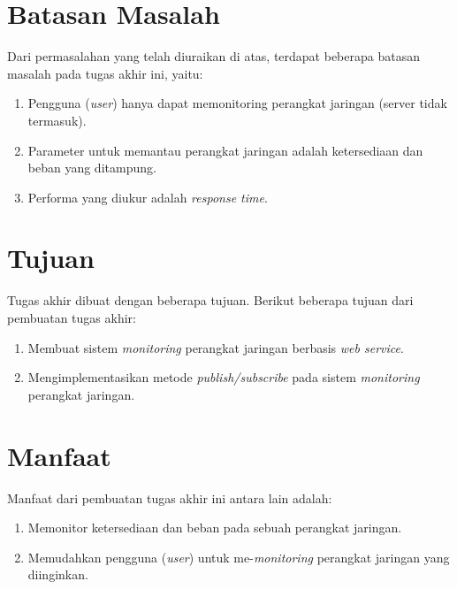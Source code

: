 	\section{Batasan Masalah}
		Dari permasalahan yang telah diuraikan di atas, terdapat beberapa batasan masalah pada tugas akhir ini, yaitu:
		\begin{enumerate}
			\item Pengguna (\textit{user}) hanya dapat memonitoring perangkat jaringan (server tidak termasuk).
            \item Parameter untuk memantau perangkat jaringan adalah ketersediaan dan beban yang ditampung.
            \item Performa yang diukur adalah \textit{response time}.
		\end{enumerate}

	\section{Tujuan}
       	Tugas akhir dibuat dengan beberapa tujuan. Berikut beberapa tujuan dari pembuatan tugas akhir:
       	\begin{enumerate}
       		\item Membuat sistem \textit{monitoring} perangkat jaringan berbasis \textit{web service}.
       		\item Mengimplementasikan metode \textit{publish/subscribe} pada sistem \textit{monitoring} perangkat jaringan.
       	\end{enumerate}
        
	\section{Manfaat}
		Manfaat dari pembuatan tugas akhir ini antara lain adalah:
		\begin{enumerate}
			\item Memonitor ketersediaan dan beban pada sebuah perangkat jaringan.
			\item Memudahkan pengguna (\textit{user}) untuk me-\textit{monitoring} perangkat jaringan yang diinginkan.
		\end{enumerate}
